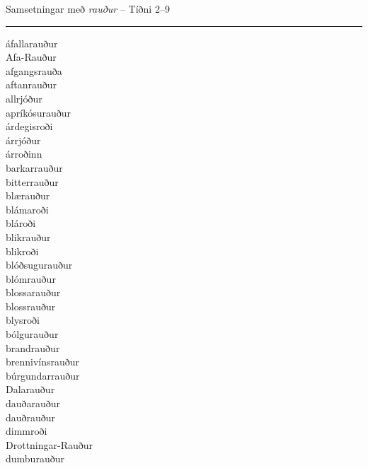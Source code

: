 \documentclass[../samsetningasafn.tex]{subfiles}
\begin{document}
\begin{bigwordlist}
\begin{footnotesize}
\begin{multicols}{4}
\begin{description}
	\end{description}
\end{multicols}
\end{footnotesize}

\label{listi:raud9}
\caption{Samsetningar með \textit{rauður} -- Tíðni 2--9}
\end{bigwordlist}


\begin{bigwordlist}
\begin{footnotesize}
	\hrule
	\vspace{5pt}
\begin{multicols}{4}
	\begin{description}
		\item [áfallarauður]
		\item [Afa-Rauður]
		\item [afgangsrauða]
		\item [aftanrauður]
		\item [allrjóður]
		\item [apríkósurauður]
		\item [árdegisroði]
		\item [árrjóður]
		\item [árroðinn]
		\item [barkarrauður]
		\item [bitterrauður]
		\item [blærauður]
		\item [blámaroði]
		\item [blároði]
		\item [blikrauður]
		\item [blikroði]
		\item [blóðsugurauður]
		\item [blómrauður]
		\item [blossarauður]
		\item [blossrauður]
		\item [blysroði]
		\item [bólgurauður]
		\item [brandrauður]
		\item [brennivínsrauður]
		\item [búrgundarrauður]
		\item [Dalarauður]
		\item [dauðarauður]
		\item [dauðrauður]
		\item [dimmroði]
		\item [Drottningar-Rauður]
		\item [dumburauður]

\end{description}
\end{multicols}
\end{footnotesize}
\end{bigwordlist}
\end{document}
